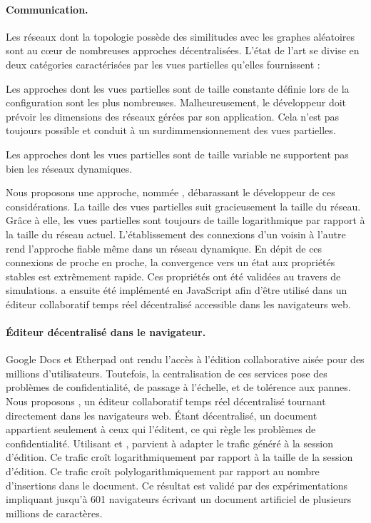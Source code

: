 \paragraph{Communication.} Les réseaux dont la topologie possède des similitudes
avec les graphes aléatoires sont au cœur de nombreuses approches
décentralisées. L'état de l'art se divise en deux catégories caractérisées par
les vues partielles qu'elles fournissent :
\begin{inparaenum}[(i)]
\item Les approches dont les vues partielles sont de taille constante définie
  lors de la configuration sont les plus nombreuses. Malheureusement, le
  développeur doit prévoir les dimensions des réseaux gérées par son
  application. Cela n'est pas toujours possible et conduit à un
  surdimmensionnement des vues partielles.
\item Les approches dont les vues partielles sont de taille variable ne
  supportent pas bien les réseaux dynamiques.
\end{inparaenum}
Nous proposons une approche, nommée \SPRAY, débarassant le développeur de ces
considérations. La taille des vues partielles suit gracieusement la taille du
réseau. Grâce à elle, les vues partielles sont toujours de taille logarithmique
par rapport à la taille du réseau actuel. L'établissement des connexions d'un
voisin à l'autre rend l'approche fiable même dans un réseau dynamique. En dépit
de ces connexions de proche en proche, la convergence vers un état aux
propriétés stables est extrêmement rapide. Ces propriétés ont été validées au
travers de simulations. \SPRAY a ensuite été implémenté en JavaScript afin
d'être utilisé dans un éditeur collaboratif temps réel décentralisé accessible
dans les navigateurs web.

\paragraph{Éditeur décentralisé dans le navigateur.} Google Docs et Etherpad ont
rendu l'accès à l'édition collaborative aisée pour des millions
d'utilisateurs. Toutefois, la centralisation de ces services pose des problèmes
de confidentialité, de passage à l'échelle, et de tolérence aux pannes. Nous
proposons \CRATE, un éditeur collaboratif temps réel décentralisé tournant
directement dans les navigateurs web. Étant décentralisé, un document appartient
seulement à ceux qui l'éditent, ce qui règle les problèmes de
confidentialité. Utilisant \SPRAY et \LSEQ, \CRATE parvient à adapter le trafic
généré à la session d'édition. Ce trafic croît logarithmiquement par rapport à
la taille de la session d'édition. Ce trafic croît polylogarithmiquement par
rapport au nombre d'insertions dans le document. Ce résultat est validé par des
expérimentations impliquant jusqu'à 601 navigateurs écrivant un document
artificiel de plusieurs millions de caractères.

